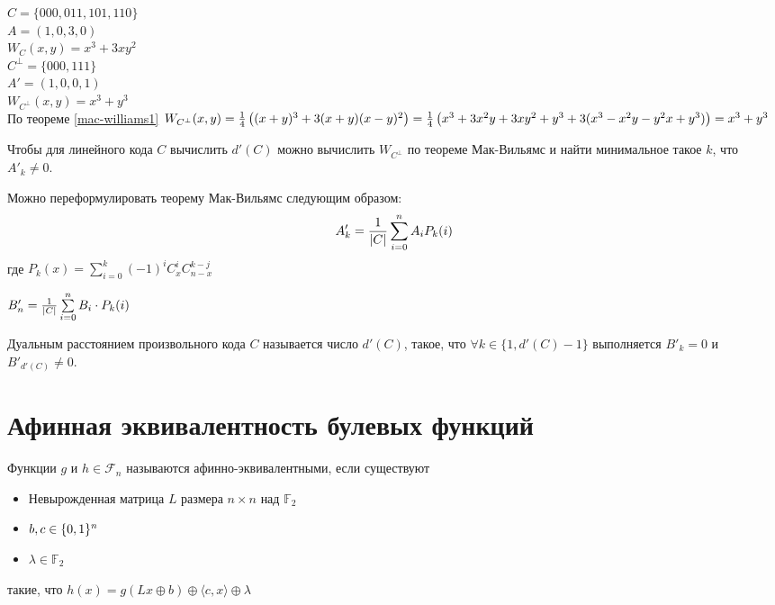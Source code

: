 \begin{example}
$C = \{000,011,101,110\}$\\
$A = (1, 0, 3, 0)$\\
$W_C (x,y) = x^3 + 3 x y^2$\\
$C^{\bot} = \{000,111\}$\\
$A' = (1,0,0,1)$\\
$W_{C^{\bot}} (x,y) = x^3 + y^3$\\
По теореме \ref{mac-williams1} 
$W_{C^{\bot}} (x,y) = {1 \over 4} \left((x+y)^3 + 3 (x+y) (x-y)^2\right)
= {1\over 4} \left(x^3 + 3x^2 y + 3x y^2 + y^3 + 3(x^3 - x^2 y - y^2 x + y^3)\right) =
x^3 + y^3$
\end{example}

\begin{remark}
Чтобы для линейного кода $C$ вычислить $d'(C)$ можно вычислить $W_{C^{\bot}}$ 
по теореме Мак-Вильямс и найти минимальное такое $k$, что $A'_k \neq 0$.
\end{remark}

\begin{corollary}
Можно переформулировать теорему Мак-Вильямс следующим образом:
$$A'_k = {1 \over |C|} \sum\limits_{i=0}^n A_i P_k(i)$$
где $P_k(x) = \sum\limits_{i=0}^k (-1)^i C_{x}^i C_{n-x}^{k-j}$
\end{corollary}

\begin{theorem}
$B'_n = {1 \over |C|} \sum\limits_{i=0}^n B_i \cdot P_k(i)$
\end{theorem}

\begin{definition}
Дуальным расстоянием произвольного кода $C$ называется число $d'(C)$,
такое, что $\forall k \in \{1, d'(C)-1\}$ выполняется $B'_k = 0$
и $B'_{d'(C)} \neq 0$.
\end{definition}

\section{Афинная эквивалентность булевых функций}

\begin{definition}
Функции $g$ и $h \in \mathscr{F}_n$ называются афинно-эквивалентными, если существуют
\begin{itemize}
\item Невырожденная матрица $L$ размера $n \times n$ над $\mathbb{F}_2$
\item $b,c \in \{0,1\}^n$
\item $\lambda \in \mathbb{F}_2$
\end{itemize}
такие, что $h(x) = g(Lx \oplus b) \oplus \langle c,x \rangle \oplus \lambda$
\end{definition}

